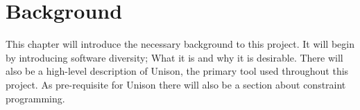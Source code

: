 \chapter{Background}

This chapter will introduce the necessary background to this project. It will begin by
introducing software diversity; What it is and why it is desirable. There will also be
a high-level description of Unison, the primary tool used throughout this project. As
pre-requisite for Unison there will also be a section about constraint programming.






